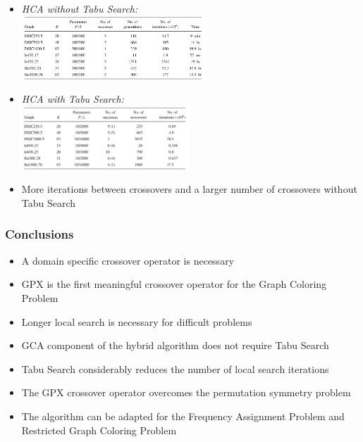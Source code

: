 \documentclass{beamer}
\begin{document}
\begin{frame}
\begin{itemize}
\item \textit{\tiny HCA without Tabu Search:}\\
\includegraphics[height=90px]{prugel2.png}
\item \textit{\tiny HCA with Tabu Search:}\\
\includegraphics[height=90px]{prugel3.png}
\item More iterations between crossovers and a larger number of crossovers without Tabu Search
\end{itemize}
\end{frame}

\begin{frame}
\frametitle{Conclusions}
\begin{itemize}
\item A domain specific crossover operator is necessary
\item GPX is the first meaningful crossover operator for the Graph Coloring Problem
\item Longer local search is necessary for difficult problems
\item GCA component of the hybrid algorithm does not require Tabu Search
\item Tabu Search considerably reduces the number of local search iterations
\item The GPX crossover operator overcomes the permutation symmetry problem
\item The algorithm can be adapted for the Frequency Assignment Problem and Restricted Graph Coloring Problem
\end{itemize}
\end{frame} 
\end{document}
